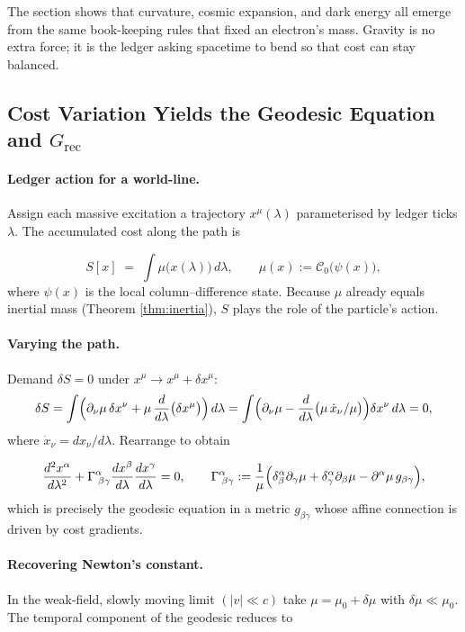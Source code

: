 \documentclass[11pt]{article}
\begin{document}
The section shows that curvature, cosmic expansion, and dark energy all
emerge from the same book-keeping rules that fixed an electron’s mass.
Gravity is no extra force; it is the ledger asking spacetime to bend so
that cost can stay balanced.

\subsection{Cost Variation Yields the Geodesic Equation and \texorpdfstring{$G_{\text{rec}}$}{Grec}}
\label{subsec:geodesic}

\paragraph{Ledger action for a world-line.}
Assign each massive excitation a trajectory \(x^{\mu}(\lambda)\)
parameterised by ledger ticks \(\lambda\).  
The accumulated cost along the path is

\[
S[x] \;=\; \int \mu\bigl(x(\lambda)\bigr)\,d\lambda,
\qquad
\mu(x) := \mathcal{C}_{0}\!\bigl(\psi(x)\bigr),
\]
where \(\psi(x)\) is the local column–difference state.  
Because \(\mu\) already equals inertial mass (Theorem
\ref{thm:inertia}), \(S\) plays the role of the particle’s action.

\paragraph{Varying the path.}
Demand \(\delta S=0\) under \(x^{\mu}\to x^{\mu}+\delta x^{\mu}\):
\[
\delta S
=
\int
\Bigl(
\partial_{\nu}\mu\,\delta x^{\nu}
+
\mu\,\frac{d}{d\lambda}\bigl(\delta x^{\mu}\bigr)\Bigr)\,d\lambda
=
\int
\Bigl(
\partial_{\nu}\mu
-
\frac{d}{d\lambda}\bigl(\mu\,\dot{x}_{\nu}/\mu\bigr)
\Bigr)\delta x^{\nu}\,d\lambda=0,
\]
where \(\dot{x}_{\nu} = dx_{\nu}/d\lambda\).
Rearrange to obtain

\[
\frac{d^{2}x^{\alpha}}{d\lambda^{2}}
+
\Gamma^{\alpha}_{\;\beta\gamma}
\frac{dx^{\beta}}{d\lambda}
\frac{dx^{\gamma}}{d\lambda}
= 0,
\qquad
\Gamma^{\alpha}_{\;\beta\gamma}
:=
\frac{1}{\mu}
\Bigl(
\delta^{\alpha}_{\beta}\partial_{\gamma}\mu
+
\delta^{\alpha}_{\gamma}\partial_{\beta}\mu
-
\partial^{\alpha}\mu\,g_{\beta\gamma}
\Bigr),
\]
which is precisely the geodesic equation in a metric
\(g_{\beta\gamma}\) whose affine connection is driven by cost gradients.

\paragraph{Recovering Newton’s constant.}
In the weak-field, slowly moving limit
\((|v|\ll c)\)
take \(\mu = \mu_{0}+ \delta\mu\) with \(\delta\mu\ll\mu_{0}\).  
The temporal component of the geodesic reduces to
\end{document}
